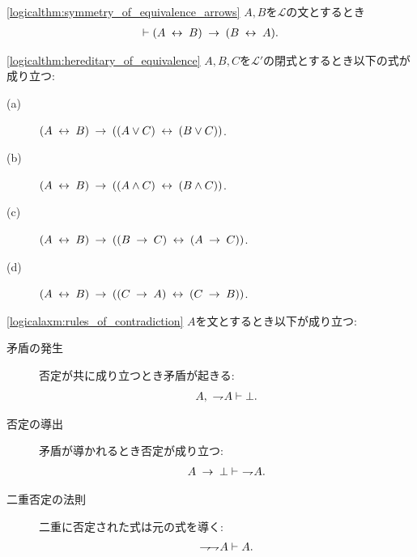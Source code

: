 	\begin{screen}
		\begin{logicalthm}[同値関係の対称律]
		\ref{logicalthm:symmetry_of_equivalence_arrows}
			$A,B$を$\mathcal{L}$の文とするとき
			\begin{align}
				\vdash (A \lrarrow B) \rarrow (B \lrarrow A).
			\end{align}
		\end{logicalthm}
	\end{screen}
	
	\begin{screen}
		\begin{logicalthm}[同値記号の遺伝性質]
		\ref{logicalthm:hereditary_of_equivalence}
			$A,B,C$を$\mathcal{L}'$の閉式とするとき以下の式が成り立つ:
			\begin{description}
				\item[(a)] $(A \lrarrow B) \rarrow ((A \vee C) \lrarrow (B \vee C))$.
				\item[(b)] $(A \lrarrow B) \rarrow ((A \wedge C) \lrarrow (B \wedge C))$.
				\item[(c)] $(A \lrarrow B) \rarrow ((B \rarrow C) \lrarrow (A \rarrow C))$.
				
				\item[(d)] $(A \lrarrow B) \rarrow ((C \rarrow A) \lrarrow (C \rarrow B))$.
			\end{description}
		\end{logicalthm}
	\end{screen}
	
	\begin{screen}
		\begin{logicalaxm}[矛盾と否定に関する規則]
		\ref{logicalaxm:rules_of_contradiction}
			$A$を文とするとき以下が成り立つ:
			\begin{description}
				\item[矛盾の発生] 否定が共に成り立つとき矛盾が起きる:
					\begin{align}
						A,\ \negation A \vdash \bot.
					\end{align}
				\item[否定の導出] 矛盾が導かれるとき否定が成り立つ:
					\begin{align}
						A \rarrow \bot \vdash\ \negation A.
					\end{align}
				\item[二重否定の法則] 二重に否定された式は元の式を導く:
					\begin{align}
						\negation \negation A \vdash A.
					\end{align}
			\end{description}
		\end{logicalaxm}
	\end{screen}
	
